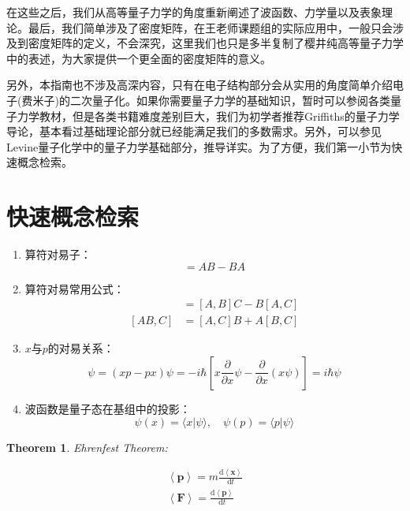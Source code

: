 \documentclass[12pt,a4paper,openany,twoside]{book}
\newtheorem{theorem}{Theorem}[section]
\numberwithin{equation}{section}
\newcommand{\mean}[1]{\left\langle #1 \right\rangle}
\newcommand{\ud}{\mathrm{d}}
\begin{document}
      在这些之后，我们从高等量子力学的角度重新阐述了波函数、力学量以及表象理论。最后，我们简单涉及了密度矩阵，在王老师课题组的实际应用中，一般只会涉及到密度矩阵的定义，不会深究，这里我们也只是多半复制了樱井纯高等量子力学中的表述，为大家提供一个更全面的密度矩阵的意义。
      
      另外，本指南也不涉及高深内容，只有在电子结构部分会从实用的角度简单介绍电子(费米子)的二次量子化。如果你需要量子力学的基础知识，暂时可以参阅各类量子力学教材，但是各类书籍难度差别巨大，我们为初学者推荐Griffiths的量子力学导论，基本看过基础理论部分就已经能满足我们的多数需求。另外，可以参见Levine量子化学中的量子力学基础部分，推导详实。为了方便，我们第一小节为快速概念检索。

      \section{快速概念检索}
        \begin{enumerate}
          \item 算符对易子：
            \begin{equation}
              [A,B] = AB - BA
            \end{equation}

          \item 算符对易常用公式：
            \begin{align}
              [A,BC]& = [A,B]C - B[A,C]\\
              [AB,C]& = [A,C]B + A[B,C]
            \end{align}

          \item $x$与$p$的对易关系：
            \begin{equation}
              [x,p]\psi=(xp-px)\psi = -i\hbar[x \frac{\partial}{\partial x}\psi-\frac{\partial}{\partial x}(x\psi)]= i\hbar \psi
            \end{equation}

          \item 波函数是量子态在基组中的投影：
            \begin{equation}
              \psi (x) = \langle x | \psi \rangle , \quad \psi(p) = \langle p | \psi \rangle
            \end{equation} 
        \end{enumerate}
      

        \begin{theorem}
          Ehrenfest Theorem:
          
          \begin{align}
            \mean{\textbf{p}}= m \frac{\ud\mean{\textbf{x}}}{\ud t}\\
            \mean{\textbf{F}}= \frac{\ud\mean{\textbf{p}}}{\ud t}
          \end{align}
        \end{theorem}
\end{document}
